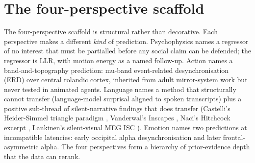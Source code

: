 \documentclass[preprint,12pt]{elsarticle}
\begin{document}
\section{The four-perspective scaffold}

The four-perspective scaffold is structural rather than decorative. Each perspective makes a different \textit{kind} of prediction. Psychophysics names a regressor of no interest that must be partialled before any social claim can be defended; the regressor is LLR, with motion energy as a named follow-up. Action names a band-and-topography prediction: mu-band event-related desynchronisation (ERD) over central rolandic cortex, inherited from adult mirror-system work \cite{hari1998action,pineda2005mu} but never tested in animated agents. Language names a method that structurally cannot transfer (language-model surprisal aligned to spoken transcripts) plus a positive sub-thread of silent-narrative findings that does transfer (Castelli's Heider-Simmel triangle paradigm \cite{castelli2000heider}, Vanderwal's Inscapes \cite{Vanderwal2015InscapesAM}, Naci's Hitchcock excerpt \cite{Naci2014ACN}, Lankinen's silent-visual MEG ISC \cite{Lankinen2014IntersubjectCO}). Emotion names two predictions at incompatible latencies: early occipital alpha desynchronisation and later frontal-asymmetric alpha. The four perspectives form a hierarchy of prior-evidence depth that the data can rerank.
\end{document}
